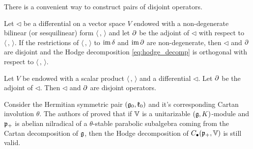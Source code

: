 \documentclass[12pt,a4paper,final]{report}
\begin{document}
There is a convenient way to construct pairs of disjoint operators.
\begin{proposition} %
 Let $\lhd$ be a differential on a vector space $V$ endowed with a non-degenerate bilinear (or sesquilinear) form $\langle \, , \, \rangle$ and let $\operatorname{\partial}$ be the adjoint of $\lhd$ with respect to $\langle \, , \, \rangle$. If the restrictions of $\langle \, , \, \rangle$ to $\operatorname{\mathrm{im}} \operatorname{\delta}$ and $\operatorname{\mathrm{im}} \operatorname{\partial}$ are non-degenerate, then $\lhd$ and $\operatorname{\partial}$ are disjoint and the Hodge decomposition \eqref{eq:hodge_decomp} is orthogonal with respect to $\langle \, , \, \rangle$.
\end{proposition}
%
%
\begin{corollary}
 Let $V$ be endowed with a scalar product $\langle \, , \, \rangle$ and a differential $\lhd$. Let $\operatorname{\partial}$ be the adjoint of $\lhd$. Then $\lhd$ and $\operatorname{\partial}$ are disjoint operators. 
\end{corollary}



Consider the Hermitian symmetric pair $(\mathfrak{g}_0, \mathfrak{k}_0)$ and it's corresponding Cartan involution $\theta$. The authors of \cite{huang_dirac_2006} proved that if $\mathbb{V}$ is a unitarizable $(\mathfrak{g},K)$-module and $\mathfrak{p}_+$ is abelian nilradical of a $\theta$-stable parabolic subalgebra coming from the Cartan decomposition of $\mathfrak{g}$, then the Hodge decomposition of $C_\bullet(\mathfrak{p}_+,\mathbb{V})$ is still valid.
\end{document}
